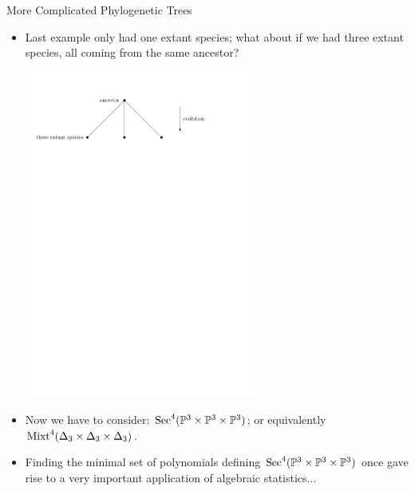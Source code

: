 \begin{frame}{More Complicated Phylogenetic Trees}

    \begin{itemize}
        \item Last example only had one extant species; what about if we had three extant species, all coming from the same ancestor?

    \begin{center}
        \includegraphics[width=0.6\textwidth, angle=0]{resources/three-extant.pdf}
    \end{center}

    \item Now we have to consider: $\operatorname{Sec}^{4}(\mathbb{P}^{3} \times \mathbb{P}^{3} \times \mathbb{P}^{3})$; or equivalently $\operatorname{Mixt}^{4}(\Delta_{3} \times \Delta_{3} \times \Delta_{3})$.

    \item Finding the minimal set of polynomials defining $\operatorname{Sec}^{4}(\mathbb{P}^{3} \times \mathbb{P}^{3} \times \mathbb{P}^{3})$ once gave rise to a very important application of algebraic statistics...

    \end{itemize}

\end{frame}

